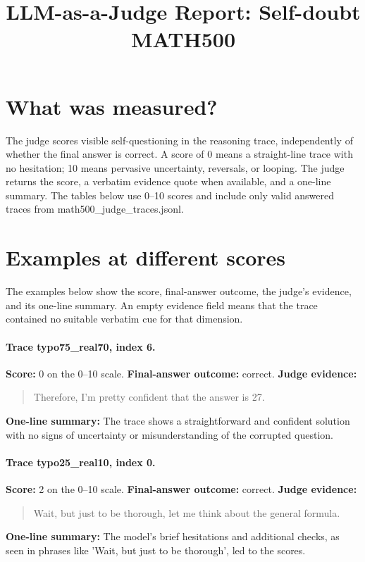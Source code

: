 \documentclass[11pt]{article}
\title{LLM-as-a-Judge Report: Self-doubt\\\large MATH500}
\date{}
\begin{document}
\maketitle

\section*{What was measured?} The judge scores visible self-questioning in the reasoning trace, independently of whether the final answer is correct. A score of 0 means a straight-line trace with no hesitation; 10 means pervasive uncertainty, reversals, or looping. The judge returns the score, a verbatim evidence quote when available, and a one-line summary. The tables below use 0--10 scores and include only valid answered traces from math500\_judge\_traces.jsonl.

\section*{Examples at different scores} The examples below show the score, final-answer outcome, the judge's evidence, and its one-line summary. An empty evidence field means that the trace contained no suitable verbatim cue for that dimension.

\paragraph{Trace typo75\_real70, index 6.}
\textbf{Score:} 0 on the 0--10 scale. \textbf{Final-answer outcome:} correct.
\textbf{Judge evidence:} \begin{quote}Therefore, I'm pretty confident that the answer is 27.\end{quote}
\textbf{One-line summary:} The trace shows a straightforward and confident solution with no signs of uncertainty or misunderstanding of the corrupted question.\medskip
\paragraph{Trace typo25\_real10, index 0.}
\textbf{Score:} 2 on the 0--10 scale. \textbf{Final-answer outcome:} correct.
\textbf{Judge evidence:} \begin{quote}Wait, but just to be thorough, let me think about the general formula.\end{quote}
\textbf{One-line summary:} The model's brief hesitations and additional checks, as seen in phrases like 'Wait, but just to be thorough', led to the scores.\medskip
\end{document}
